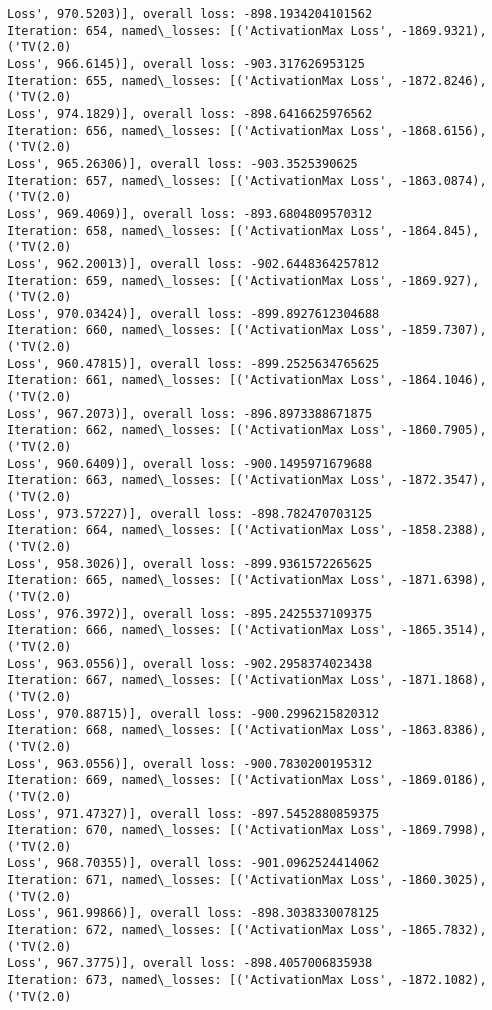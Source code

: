 \documentclass[10pt]{article}
\begin{document}
\begin{Verbatim}[commandchars=\\\{\}]
Loss', 970.5203)], overall loss: -898.1934204101562
Iteration: 654, named\_losses: [('ActivationMax Loss', -1869.9321), ('TV(2.0)
Loss', 966.6145)], overall loss: -903.317626953125
Iteration: 655, named\_losses: [('ActivationMax Loss', -1872.8246), ('TV(2.0)
Loss', 974.1829)], overall loss: -898.6416625976562
Iteration: 656, named\_losses: [('ActivationMax Loss', -1868.6156), ('TV(2.0)
Loss', 965.26306)], overall loss: -903.3525390625
Iteration: 657, named\_losses: [('ActivationMax Loss', -1863.0874), ('TV(2.0)
Loss', 969.4069)], overall loss: -893.6804809570312
Iteration: 658, named\_losses: [('ActivationMax Loss', -1864.845), ('TV(2.0)
Loss', 962.20013)], overall loss: -902.6448364257812
Iteration: 659, named\_losses: [('ActivationMax Loss', -1869.927), ('TV(2.0)
Loss', 970.03424)], overall loss: -899.8927612304688
Iteration: 660, named\_losses: [('ActivationMax Loss', -1859.7307), ('TV(2.0)
Loss', 960.47815)], overall loss: -899.2525634765625
Iteration: 661, named\_losses: [('ActivationMax Loss', -1864.1046), ('TV(2.0)
Loss', 967.2073)], overall loss: -896.8973388671875
Iteration: 662, named\_losses: [('ActivationMax Loss', -1860.7905), ('TV(2.0)
Loss', 960.6409)], overall loss: -900.1495971679688
Iteration: 663, named\_losses: [('ActivationMax Loss', -1872.3547), ('TV(2.0)
Loss', 973.57227)], overall loss: -898.782470703125
Iteration: 664, named\_losses: [('ActivationMax Loss', -1858.2388), ('TV(2.0)
Loss', 958.3026)], overall loss: -899.9361572265625
Iteration: 665, named\_losses: [('ActivationMax Loss', -1871.6398), ('TV(2.0)
Loss', 976.3972)], overall loss: -895.2425537109375
Iteration: 666, named\_losses: [('ActivationMax Loss', -1865.3514), ('TV(2.0)
Loss', 963.0556)], overall loss: -902.2958374023438
Iteration: 667, named\_losses: [('ActivationMax Loss', -1871.1868), ('TV(2.0)
Loss', 970.88715)], overall loss: -900.2996215820312
Iteration: 668, named\_losses: [('ActivationMax Loss', -1863.8386), ('TV(2.0)
Loss', 963.0556)], overall loss: -900.7830200195312
Iteration: 669, named\_losses: [('ActivationMax Loss', -1869.0186), ('TV(2.0)
Loss', 971.47327)], overall loss: -897.5452880859375
Iteration: 670, named\_losses: [('ActivationMax Loss', -1869.7998), ('TV(2.0)
Loss', 968.70355)], overall loss: -901.0962524414062
Iteration: 671, named\_losses: [('ActivationMax Loss', -1860.3025), ('TV(2.0)
Loss', 961.99866)], overall loss: -898.3038330078125
Iteration: 672, named\_losses: [('ActivationMax Loss', -1865.7832), ('TV(2.0)
Loss', 967.3775)], overall loss: -898.4057006835938
Iteration: 673, named\_losses: [('ActivationMax Loss', -1872.1082), ('TV(2.0)

\end{Verbatim}
\end{document}
